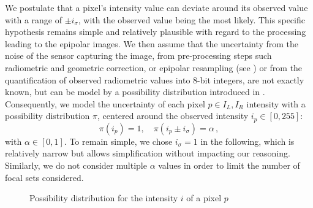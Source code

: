 We postulate that a pixel's intensity value can deviate around its observed value with a range of $\pm i_\sigma$, with the observed value being the most likely. This specific hypothesis remains simple and relatively plausible with regard to the processing leading to the epipolar images. We then assume that the uncertainty from the noise of the sensor capturing the image, from pre-processing steps such radiometric and geometric correction, or epipolar resampling (see ) or from the quantification of observed radiometric values into 8-bit integers, are not exactly known, but can be model by a possibility distribution introduced in . Consequently, we model the uncertainty of each pixel $p\in I_L,I_R$ intensity with a possibility distribution $\pi$, centered around the observed intensity $i_p\in[0,255]$:
\begin{equation}\label{eq:pixel_possibility}
    \pi(i_p)=1,\quad \pi(i_p\pm i_\sigma)=\alpha\,,
\end{equation}
with $\alpha \in [0,1]$. To remain simple, we chose $i_\sigma=1$ in the following, which is relatively narrow but allows simplification without impacting our reasoning. Similarly, we do not consider multiple $\alpha$ values in order to limit the number of focal sets considered.
\begin{figure}[!ht]
    \centering
    \caption{Possibility distribution for the intensity $i$ of a  pixel $p$}
    \label{fig:possibility_pixel_intensity}
\end{figure}
